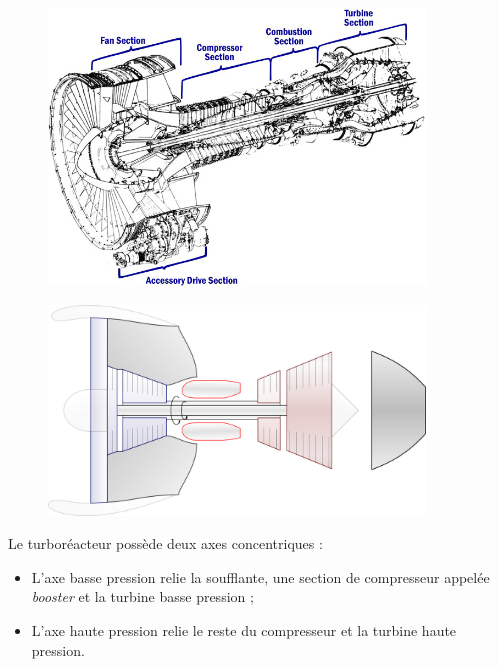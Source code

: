 	\begin{figure}
		\begin{center}
		\includegraphics[width=10cm]{images/cf6_cutaway.jpg}
		\end{center}
		\label{fig_cf6_1}
	\end{figure}
	
	\begin{figure}
		\begin{center}
		\onlyamphibook{\vspace{-0.5cm}}
		\includegraphics[width=10cm]{images/circuit_turbofan_twin_spool.png}
		\end{center}
		\label{fig_cf6_2}
	\end{figure}
	
	Le turboréacteur possède deux axes concentriques :
		
	\begin{itemize}
		\item L’axe basse pression relie la soufflante, une section de compresseur appelée \textit{booster} et la turbine basse pression ;
		\item L’axe haute pression relie le reste du compresseur et la turbine haute pression.
	\end{itemize}	

